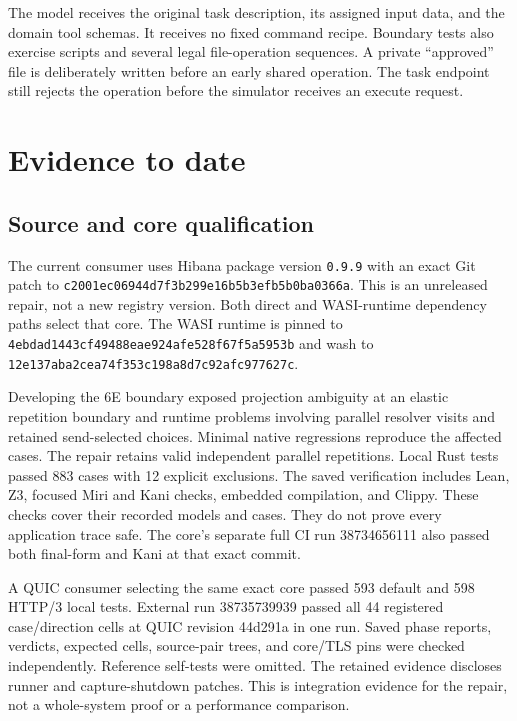 \documentclass[10pt]{article}
\begin{document}
The model receives the original task description, its assigned input data, and
the domain tool schemas. It receives no fixed command recipe. Boundary tests
also exercise scripts and several legal file-operation sequences. A private
``approved'' file is deliberately written before an early shared operation.
The task endpoint still rejects the operation before the simulator receives
an execute request.

\section{Evidence to date}
\subsection{Source and core qualification}
The current consumer uses Hibana package version \texttt{0.9.9} with an exact Git
patch to \texttt{c2001ec06944d7f3b299e16b5b3efb5b0ba0366a}. This is an unreleased
repair, not a new registry version. Both direct and WASI-runtime dependency
paths select that core. The WASI runtime is pinned to
\texttt{4ebdad1443cf49488eae924afe528f67f5a5953b} and wash to
\texttt{12e137aba2cea74f353c198a8d7c92afc977627c}.

Developing the 6E boundary exposed projection ambiguity at an elastic repetition
boundary and runtime problems involving parallel resolver visits and retained
send-selected choices. Minimal native regressions reproduce the affected cases.
The repair retains valid independent parallel repetitions. Local Rust tests
passed 883 cases with 12 explicit exclusions. The saved verification includes
Lean, Z3, focused Miri and Kani checks, embedded compilation, and Clippy.
These checks cover their recorded models and cases. They do not prove every
application trace safe. The core's separate full CI run 38734656111 also passed
both final-form and Kani at that exact commit.

A QUIC consumer selecting the same exact core passed 593 default and 598 HTTP/3
local tests. External run 38735739939 passed all 44 registered case/direction
cells at QUIC revision 44d291a in one run. Saved phase reports, verdicts,
expected cells, source-pair trees, and core/TLS pins were checked independently.
Reference self-tests were omitted. The retained evidence discloses runner and
capture-shutdown patches. This is integration evidence for the repair, not a
whole-system proof or a performance comparison.
\end{document}
